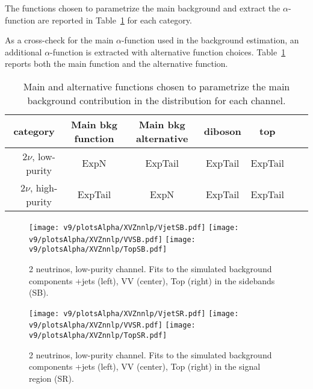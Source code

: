 The functions chosen to parametrize the main background and extract the $\alpha$-function are reported in Table~\ref{tab:XMassFunctions} for each category.

As a cross-check for the main $\alpha$-function used in the background estimation, an additional $\alpha$-function is extracted with alternative function choices. Table~\ref{tab:XMassFunctions} reports both the main function and the alternative function.

\begin{table}[!htb]
  \begin{center}
    \begin{tabular}{cc|cccccc}
      \multicolumn{2}{c}{category} & Main bkg function & Main bkg alternative & diboson & top \\
      \hline
       & $2\nu$, low-purity  & ExpN & ExpTail & ExpTail & ExpTail \\
      \hline
       & $2\nu$, high-purity  & ExpTail & ExpN & ExpTail & ExpTail \\
      \hline
    \end{tabular}
  \end{center}
  \caption{Main and alternative functions chosen to parametrize the main background contribution in the \mtVZ distribution for each channel.}\label{tab:XMassFunctions}
\end{table}



\clearpage


\begin{figure}[!htb]
  \centering
    \texttt{[image: v9/plotsAlpha/XVZnnlp/VjetSB.pdf]}
    \texttt{[image: v9/plotsAlpha/XVZnnlp/VVSB.pdf]}
    \texttt{[image: v9/plotsAlpha/XVZnnlp/TopSB.pdf]}
    \caption{2 neutrinos, low-purity channel. Fits to the simulated background components \V+jets (left), VV (center), Top (right) in the sidebands (SB).}
  \label{fig:XVZnnlp_SB}
\end{figure}

\begin{figure}[!htb]
  \centering
    \texttt{[image: v9/plotsAlpha/XVZnnlp/VjetSR.pdf]}
    \texttt{[image: v9/plotsAlpha/XVZnnlp/VVSR.pdf]}
    \texttt{[image: v9/plotsAlpha/XVZnnlp/TopSR.pdf]}
    \caption{2 neutrinos, low-purity channel. Fits to the simulated background components \V+jets (left), VV (center), Top (right) in the signal region (SR).}
  \label{fig:XVZnnlp_SR}
\end{figure}

